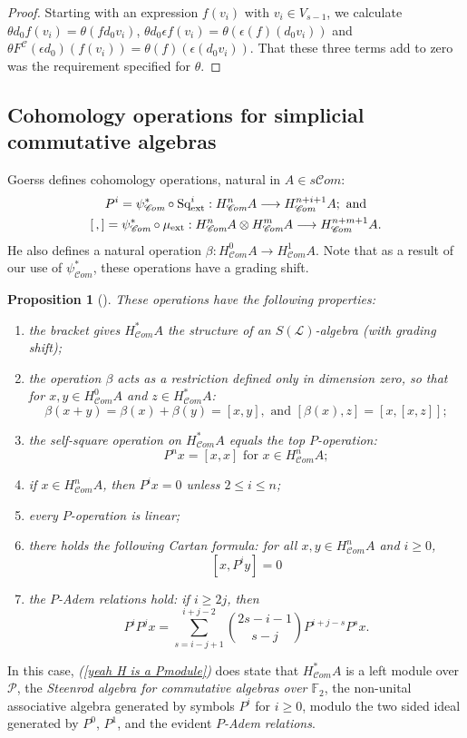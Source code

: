 \documentclass[11pt]{amsart}
\theoremstyle{plain}
\newtheorem{prop}[thm]{Proposition}
\theoremstyle{definition}
\renewcommand{\to}{\longrightarrow}
\newcommand{\scrL}{\mathscr{L}}
\newcommand{\scrC}{\mathscr{C}}
\newcommand{\calP}{\mathcal{P}}
\newcommand{\calc}{\mathcal{C}}
\theoremstyle{plain}
\newcommand{\Palg}{{\calP}}
\newcommand{\LieOperad}{{\scrL}}
\newcommand{\ExtCohOp}{\textup{Sq}_\textup{ext}}
\newcommand{\ExtCohProd}{\mu_\textup{ext}}
\newcommand{\F}{\mathbb{F}}
\newcommand{\algs}{{\scrC\!\textit{om}}}
\newcommand{\Ftwo}{\F_2}
\begin{document}
\begin{Constructing (co)homotopy operations}
\begin{proof}
Starting with an expression $f(v_i)$ with $v_i\in V_{s-1}$, we calculate $\theta d_0 f(v_i)=\theta (fd_0v_i)$, $\theta d_0\epsilon f(v_i)=\theta (\epsilon (f)(d_0v_i))$ and $\theta F^\calc (\epsilon d_0)(f(v_i))=\theta(f)(\epsilon(d_0v_i))$. That these three terms add to zero was the requirement specified for $\theta$.
\end{proof}



\subsection{Cohomology operations for simplicial commutative algebras}\label{The example of simplicial commutative F2-algebras}
Goerss \cite[\S5]{MR1089001} defines cohomology operations, natural in $A\in s \algs$:
\begin{gather*}
P^i=\psi^*_{\algs}\circ\ExtCohOp^i:H^n_{\algs}A\to H_{\algs}^{n+i+1}A;\textup{ and}\\
[\,,]=\psi^*_{\algs}\circ\ExtCohProd :H_{\algs}^nA\otimes H_{\algs}^mA\to H_{\algs}^{n+m+1}A.
\end{gather*}
He also defines a natural operation $\beta:H_{\algs}^0A\to H_{\algs}^1A$. Note that as a result of our use of $\psi^*_{\algs}$, these operations have a grading shift.
\begin{prop}[{\cite[\S5]{MR1089001}}]\label{omnibus on coh of simp algs}These operations have the following properties:
\begin{enumerate}
\item the bracket gives $H^*_{\algs}A$ the structure of an $S(\LieOperad)$-algebra (with grading shift);
\item the operation $\beta$ acts as a restriction defined only in dimension zero, so that for $x,y\in H^0_{\algs}A$ and $z\in H^*_{\algs}A$:
\[\beta(x+y)=\beta(x)+\beta(y)=[x,y],\text{\ \ and \ }[\beta(x),z]=[x,[x,z]];\]
\item the self-square operation on $H^*_{\algs}A$ equals the top $P$-operation:\[P^nx=[x,x]\text{\ \ for $x\in H^n_{\algs}A$};\]
\item \label{P unstable vanishing} if $x\in H^n_{\algs}A$, then $P^ix=0$ unless $2\leq i\leq n$;
\item every $P$-operation is linear;
\item there holds the following \emph{Cartan formula}:  for all $x,y\in   H^n_{\algs}A$ and $i\geq0$,
\[[x,P^iy]=0\]
\item \label{yeah H is a Pmodule}the \emph{$P$-Adem relations} hold: if $i\geq 2j$, then
\[P^iP^jx=\sum_{s=i-j+1}^{i+j-2}{2s-i-1\choose s-j}P^{i+j-s}P^sx.\]
\end{enumerate}
\end{prop}
In this case, \emph{(\ref{yeah H is a Pmodule})} does state that $H^*_{\algs}A$ is a left module over $\Palg$, the \emph{Steenrod algebra for commutative algebras over $\Ftwo $}, the non-unital associative algebra generated by symbols $P^i$ for $i\geq0$, modulo the two sided ideal generated by $P^0$, $P^1$, and the evident \emph{$P$-Adem relations}.



\end{Constructing (co)homotopy operations}
\end{document}

